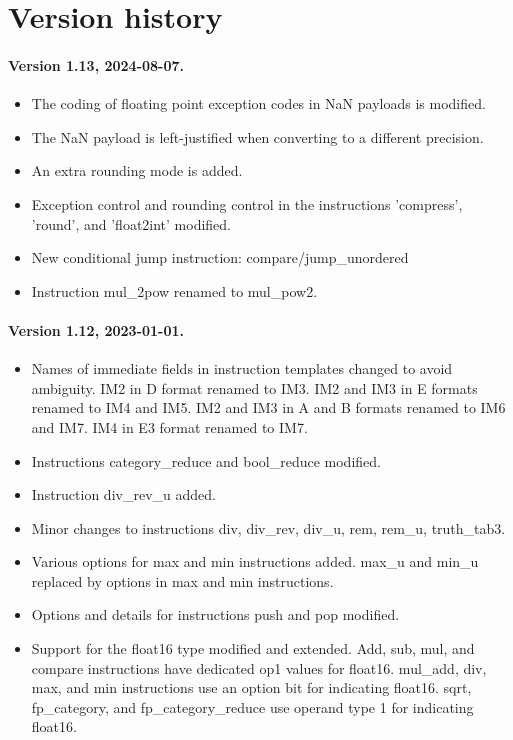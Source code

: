 \documentclass[forwardcom.tex]{subfiles}
\begin{document}
\RaggedRight

\chapter{Version history}

\subsubsection{Version 1.13, 2024-08-07.}
\begin{itemize}
\item The coding of floating point exception codes in NaN payloads is modified.
\item The NaN payload is left-justified when converting to a different precision.
\item An extra rounding mode is added.
\item Exception control and rounding control in the instructions 'compress', 'round', and 'float2int' modified.
\item New conditional jump instruction: compare/jump\_unordered
\item Instruction mul\_2pow renamed to mul\_pow2.
\end{itemize}


\subsubsection{Version 1.12, 2023-01-01.}
\begin{itemize}
\item Names of immediate fields in instruction templates changed to avoid ambiguity. IM2 in D format renamed to IM3. IM2 and IM3 in E formats renamed to IM4 and IM5. IM2 and IM3 in A and B formats renamed to IM6 and IM7. IM4 in E3 format renamed to IM7.
\item Instructions category\_reduce and bool\_reduce modified.
\item Instruction div\_rev\_u added.
\item Minor changes to instructions div, div\_rev, div\_u, rem, rem\_u, truth\_tab3.
\item Various options for max and min instructions added. max\_u and min\_u replaced by options in max and min instructions.
\item Options and details for instructions push and pop modified.
\item Support for the float16 type modified and extended. Add, sub, mul, and compare instructions have dedicated op1 values for float16. mul\_add, div, max, and min instructions use an option bit for indicating float16. sqrt, fp\_category, and fp\_category\_reduce use operand type 1 for indicating float16.

\end{itemize}
\end{document}

